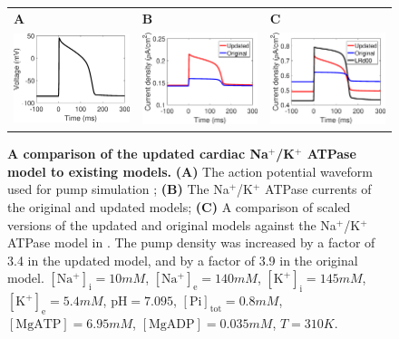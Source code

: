 \documentclass[fleqn,10pt]{physiome}
\begin{document}
\begin{figure}
\centering
\begin{tabular}{l l l}
{\Large\textbf{A}} & {\Large\textbf{B}} & {\Large\textbf{C}} \\
\includegraphics[width=0.3\linewidth]{LRd_AP_waveform.eps} &
\includegraphics[width=0.3\linewidth]{NaK_current.eps} &
\includegraphics[width=0.3\linewidth]{NaK_current_scaled.eps} 
\end{tabular}
\caption{\textbf{A comparison of the updated cardiac Na$^+$/K$^+$ ATPase model to existing models.} \textbf{(A)} The action potential waveform used for pump simulation \citep{faber_action_2000}; \textbf{(B)} The Na$^+$/K$^+$ ATPase currents of the original and updated models; \textbf{(C)} A comparison of scaled versions of the updated and original models against the Na$^+$/K$^+$ ATPase model in \citet{faber_action_2000}. The pump density was increased by a factor of 3.4 in the updated model, and by a factor of 3.9 in the original model. $\mathrm{[Na^+]_i} = 10\si{mM}$, $\mathrm{[Na^+]_e} = 140\si{mM}$, $\mathrm{[K^+]_i} = 145\si{mM}$, $\mathrm{[K^+]_e} = 5.4\si{mM}$, $\mathrm{pH} = 7.095$, $\mathrm{[Pi]_{tot}} = 0.8\si{mM}$, $\mathrm{[MgATP]} = 6.95\si{mM}$, $\mathrm{[MgADP]} = 0.035\si{mM}$, $T = 310\si{K}$.}
\label{fig:updated_original_comp}
\end{figure}
\end{document}
